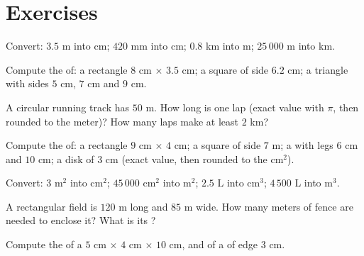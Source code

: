 \section{Exercises}

\begin{exercise}[$\star$]\label{exo:g6:measure:1}
Convert: $3.5$ m into cm; $420$ mm into cm; $0.8$ km into m;
$25\,000$ m into km.
\end{exercise}

\begin{exercise}[$\star$]\label{exo:g6:measure:2}
Compute the  of: a rectangle $8$ cm $\times$ $3.5$ cm; a
square of side $6.2$ cm; a triangle with sides $5$ cm, $7$ cm and
$9$ cm.
\end{exercise}

\begin{exercise}[$\star$]\label{exo:g6:measure:3}
A circular running track has  $50$ m. How long is one lap
(exact value with $\pi$, then rounded to the meter)? How many laps make
at least $2$ km?
\end{exercise}

\begin{exercise}[$\star$]\label{exo:g6:measure:4}
Compute the  of: a rectangle $9$ cm $\times$ $4$ cm; a square of
side $7$ m; a  with legs $6$ cm and $10$ cm; a disk of
 $3$ cm (exact value, then rounded to the cm$^2$).
\end{exercise}

\begin{exercise}[$\star$]\label{exo:g6:measure:5}
Convert: $3$ m$^2$ into cm$^2$; $45\,000$ cm$^2$ into m$^2$; $2.5$ L
into cm$^3$; $4\,500$ L into m$^3$.
\end{exercise}

\begin{exercise}[$\star$]\label{exo:g6:measure:6}
A rectangular field is $120$ m long and $85$ m wide. How many meters of
fence are needed to enclose it? What is its ?
\end{exercise}

\begin{exercise}[$\star$]\label{exo:g6:measure:7}
Compute the  of a  $5$ cm $\times$ $4$ cm $\times$ $10$ cm,
and of a  of edge $3$ cm.
\end{exercise}

